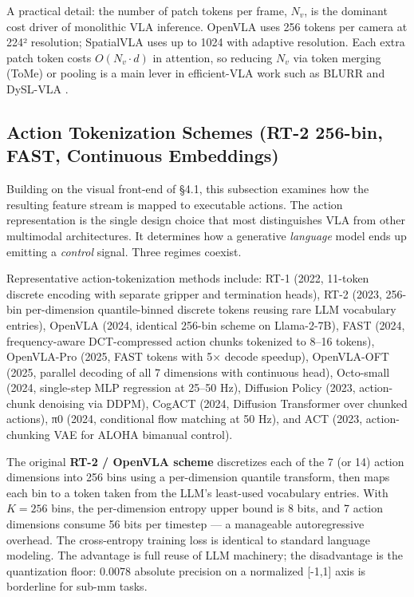 \documentclass{article}
\begin{document}
A practical detail: the number of patch tokens per frame, \(N_v\), is the dominant cost driver of monolithic VLA inference. OpenVLA uses 256 tokens per camera at 224² resolution; SpatialVLA uses up to 1024 with adaptive resolution. Each extra patch token costs \(O(N_v \cdot d)\) in attention, so reducing \(N_v\) via token merging (ToMe) or pooling is a main lever in efficient-VLA work such as BLURR \cite{ma2025blurraboostedlowre} and DySL-VLA \cite{yang2026dyslvlaefficientvi}.

\subsection{Action Tokenization Schemes (RT-2 256-bin, FAST, Continuous Embeddings)}\label{action-tokenization-schemes-rt-2-256-bin-fast-continuous-embeddings}

Building on the visual front-end of §4.1, this subsection examines how the resulting feature stream is mapped to executable actions. The action representation is the single design choice that most distinguishes VLA from other multimodal architectures. It determines how a generative \emph{language} model ends up emitting a \emph{control} signal. Three regimes coexist.

Representative action-tokenization methods include: RT-1 (2022, 11-token discrete encoding with separate gripper and termination heads), RT-2 (2023, 256-bin per-dimension quantile-binned discrete tokens reusing rare LLM vocabulary entries), OpenVLA (2024, identical 256-bin scheme on Llama-2-7B), FAST (2024, frequency-aware DCT-compressed action chunks tokenized to 8--16 tokens), OpenVLA-Pro (2025, FAST tokens with 5× decode speedup), OpenVLA-OFT (2025, parallel decoding of all 7 dimensions with continuous head), Octo-small (2024, single-step MLP regression at 25--50 Hz), Diffusion Policy (2023, action-chunk denoising via DDPM), CogACT (2024, Diffusion Transformer over chunked actions), π0 (2024, conditional flow matching at 50 Hz), and ACT (2023, action-chunking VAE for ALOHA bimanual control).

The original \textbf{RT-2 / OpenVLA scheme} discretizes each of the 7 (or 14) action dimensions into 256 bins using a per-dimension quantile transform, then maps each bin to a token taken from the LLM's least-used vocabulary entries. With \(K = 256\) bins, the per-dimension entropy upper bound is 8 bits, and 7 action dimensions consume 56 bits per timestep --- a manageable autoregressive overhead. The cross-entropy training loss is identical to standard language modeling. The advantage is full reuse of LLM machinery; the disadvantage is the quantization floor: 0.0078 absolute precision on a normalized {[}-1,1{]} axis is borderline for sub-mm tasks.
\end{document}
